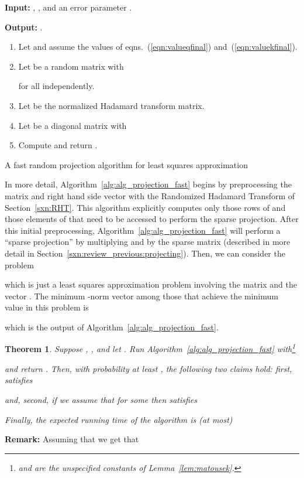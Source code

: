 \documentclass[11pt]{article}
\newtheorem{theorem}{Theorem}
\begin{document}
\begin{algorithm}[h]
\begin{framed}

\textbf{Input:} , , and an error parameter .

\vspace{0.1in}

\textbf{Output:} .

\begin{enumerate}

\item Let  and  assume the values of eqns.~(\ref{eqn:valueqfinal}) and~(\ref{eqn:valuekfinal}).

\item Let  be a random matrix with

for all  independently.
\item Let  be the normalized Hadamard transform
matrix.

\item Let  be a diagonal matrix with

\item
Compute and return
.
\end{enumerate}

\end{framed}
\caption{A fast random projection algorithm for least squares
approximation} \label{alg:alg_projection_fast}
\end{algorithm}


In more detail, Algorithm~\ref{alg:alg_projection_fast} begins by preprocessing the matrix  and right hand side vector  with the Randomized Hadamard Transform  of Section~\ref{sxn:RHT}. This algorithm explicitly computes only those rows of  and those elements of  that need to be accessed to perform the sparse projection. After this initial preprocessing, Algorithm~\ref{alg:alg_projection_fast} will perform a ``sparse projection'' by multiplying  and  by the sparse matrix  (described in more detail in
Section~\ref{sxn:review_previous:projecting}). Then, we can consider the problem

which is just a least squares approximation problem involving the matrix  and the vector . The minimum -norm vector  among those that achieve the minimum value  in this problem is

which is the output of Algorithm~\ref{alg:alg_projection_fast}.
\begin{theorem} \label{thm:alg_projection_fast}
Suppose , , and let . Run Algorithm~\ref{alg:alg_projection_fast} with\footnote{ and  are the unspecified constants of Lemma~\ref{lem:matousek}.}

and return . Then, with probability at least , the following two claims hold:
first,  satisfies

and, second, if we assume that
 for some 
then  satisfies

Finally, the expected running time of the algorithm is (at most)

\end{theorem}
\noindent \textbf{Remark:} Assuming that  we get that
\end{document}
